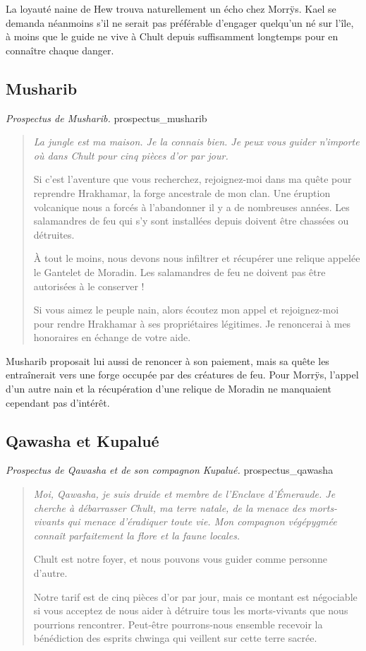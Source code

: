 La loyauté naine de Hew trouva naturellement un écho chez Morrÿs. Kael se demanda néanmoins s'il ne serait pas préférable d'engager quelqu'un né sur l'île, à moins que le guide ne vive à Chult depuis suffisamment longtemps pour en connaître chaque danger.

\subsection*{Musharib}

{\textit{Prospectus de Musharib.}}
{prospectus_musharib}

\begin{quote}\itshape
La jungle est ma maison. Je la connais bien. Je peux vous guider n'importe où dans Chult pour cinq pièces d'or par jour.

Si c'est l'aventure que vous recherchez, rejoignez-moi dans ma quête pour reprendre Hrakhamar, la forge ancestrale de mon clan. Une éruption volcanique nous a forcés à l'abandonner il y a de nombreuses années. Les salamandres de feu qui s'y sont installées depuis doivent être chassées ou détruites.

À tout le moins, nous devons nous infiltrer et récupérer une relique appelée le Gantelet de Moradin. Les salamandres de feu ne doivent pas être autorisées à le conserver !

Si vous aimez le peuple nain, alors écoutez mon appel et rejoignez-moi pour rendre Hrakhamar à ses propriétaires légitimes. Je renoncerai à mes honoraires en échange de votre aide.
\end{quote}

Musharib proposait lui aussi de renoncer à son paiement, mais sa quête les entraînerait vers une forge occupée par des créatures de feu. Pour Morrÿs, l'appel d'un autre nain et la récupération d'une relique de Moradin ne manquaient cependant pas d'intérêt.

\subsection*{Qawasha et Kupalué}

{\textit{Prospectus de Qawasha et de son compagnon Kupalué.}}
{prospectus_qawasha}

\begin{quote}\itshape
Moi, Qawasha, je suis druide et membre de l'Enclave d'Émeraude. Je cherche à débarrasser Chult, ma terre natale, de la menace des morts-vivants qui menace d'éradiquer toute vie. Mon compagnon végépygmée connaît parfaitement la flore et la faune locales.

Chult est notre foyer, et nous pouvons vous guider comme personne d'autre.

Notre tarif est de cinq pièces d'or par jour, mais ce montant est négociable si vous acceptez de nous aider à détruire tous les morts-vivants que nous pourrions rencontrer. Peut-être pourrons-nous ensemble recevoir la bénédiction des esprits chwinga qui veillent sur cette terre sacrée.
\end{quote}

